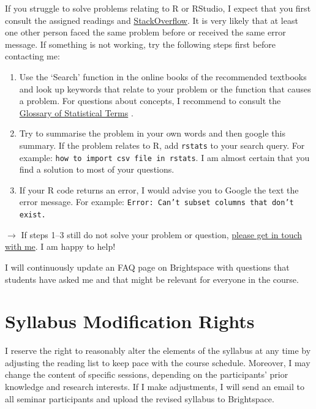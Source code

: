\documentclass[abstract=on,parskip=full,headings=standardclasses,fontsize=11pt,paper=a4]{scrartcl}
\begin{document}
If you struggle to solve problems relating to \textsf{R} or RStudio, I expect that you first consult the assigned readings and \href{https://stackoverflow.com}{StackOverflow}. It is very likely that at least one other person faced the same problem before or received the same error message.  If something is not working, try the following steps first before contacting me: 
\begin{enumerate}
\item Use the `Search' function in the online books of the recommended textbooks \autocite{ismay20,wickham17,healy19} and look up keywords that relate to your problem or the function that causes a problem. For questions about concepts, I recommend to consult the \href{https://hbiostat.org/doc/glossary.pdf}{Glossary of Statistical Terms} \autocite{harrell}.
\item Try to summarise the problem in your own words and then google this summary. If the problem relates to \textsf{R}, add \texttt{rstats} to your search query. For example: \texttt{how to import csv file in rstats}. I am almost certain that you find a solution to most of your questions. 
\item If your \textsf{R} code returns an error, I would advise you to Google the text the error message.  For example: \texttt{Error: Can't subset columns that don't exist.}
\end{enumerate}

$\longrightarrow$ If steps 1--3 still do not solve your problem or question, \href{mailto:stefan.mueller@ucd.ie}{please get in touch with me}.  I am happy to help!

I will continuously update an FAQ page on Brightspace with questions that students have asked me and that might be relevant for everyone in the course. 



\section*{Syllabus Modification Rights}

I reserve the right to reasonably alter the elements of the syllabus at any time by adjusting the reading list to keep pace with the course schedule. Moreover, I may change the content of specific sessions, depending on the participants' prior knowledge and research interests. If I make adjustments, I will send an email to all seminar participants and upload the revised syllabus to Brightspace.

\end{document}
